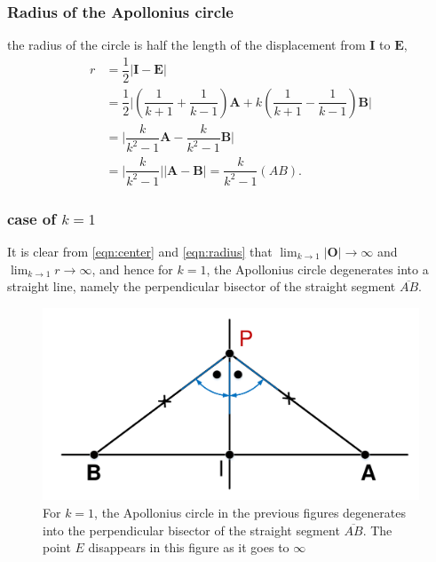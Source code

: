 \documentclass{beamer}
\begin{document}
\begin{frame}
\frametitle{Radius of the Apollonius circle}
the radius of the circle is half the length of the displacement from $\boldsymbol{I}$ to $\boldsymbol{E}$,
\begin{equation}
\begin{split}
r & =\dfrac{1}{2} \lvert \boldsymbol{I} -\boldsymbol{E}\rvert \\
& = \dfrac{1}{2} \lvert (\dfrac{1}{k+1}+\dfrac{1}{k-1})\boldsymbol{A}+k(\dfrac{1}{k+1}-\dfrac{1}{k-1}) \boldsymbol{B}\rvert \\
& =  \lvert\dfrac{k}{k^{2}-1}\boldsymbol{A} - \dfrac{k}{k^{2}-1} \boldsymbol{B}\rvert\\
& = \lvert\dfrac{k}{k^{2}-1}\rvert \lvert\boldsymbol{A} -\boldsymbol{B}\rvert = \dfrac{k}{k^{2}-1}(AB).
\end{split}
\label{eqn:radius}
\end{equation}
\end{frame}
\begin{frame}
\frametitle{case of $k=1$}
It is clear from \eqref{eqn:center} and \eqref{eqn:radius} that $\lim_{k\to1}\lvert\boldsymbol{O}\rvert\to\infty$ and $\lim_{k\to1}r\to\infty$, and hence for $k=1$, the Apollonius circle degenerates into a straight line, namely the perpendicular bisector of the straight segment $\overline{AB}$.

\begin{figure}[htb]
\centering
\includegraphics[scale = 0.3]{fig/drawing3.pdf}
\caption{For $k=1$, the Apollonius circle in the previous figures degenerates into the perpendicular bisector of the straight segment $\overline{AB}$. The point $E$ disappears in this figure as it goes to $\infty$  }
\label{3}
\end{figure}
\end{frame}
\end{document}
